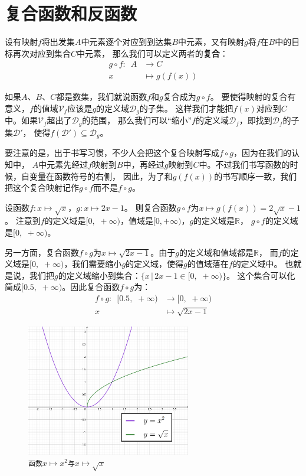\documentclass[12pt,UTF8]{ctexbook}
\begin{document}
\section{复合函数和反函数}

设有映射$f$将出发集$A$中元素逐个对应到到达集$B$中元素，又有映射$g$将$f$在$B$中的目标再次对应到集合$C$中元素，
那么我们可以定义两者的\textbf{复合}：
\begin{align*}
    g\circ f : \,\,\, A &\rightarrow C  \\
    x &\mapsto g(f(x)) 
\end{align*}

如果$A$、$B$、$C$都是数集，我们就说函数$f$和$g$复合成为$g\circ f$。
要使得映射的复合有意义，$f$的值域$\mathcal{V}_f$应该是$g$的定义域$\mathcal{D}_g$的子集。
这样我们才能把$f(x)$对应到$C$中。如果$\mathcal{V}_f$超出了$\mathcal{D}_g$的范围，
那么我们可以“缩小”$f$的定义域$\mathcal{D}_f$，即找到$\mathcal{D}_f$的子集$\mathcal{D}'$，
使得$f(\mathcal{D}')\subseteq \mathcal{D}_g$。

要注意的是，出于书写习惯，不少人会把这个复合映射写成$f\circ g$，因为在我们的认知中，
$A$中元素先经过$f$映射到$B$中，再经过$g$映射到$C$中。不过我们书写函数的时候，自变量在函数符号的右侧，
因此，为了和$g(f(x))$的书写顺序一致，我们把这个复合映射记作$g\circ f$而不是$f\circ g$。

设函数$f:x\mapsto \sqrt{x}$，$g:x\mapsto 2x - 1$。
则复合函数$g\circ f$为$x\mapsto g(f(x)) = 2\sqrt{x} - 1$。
注意到$f$的定义域是$[0, \,\,+\infty)$，值域是$[0, +\infty)$，$g$的定义域是$\mathbb{R}$，
$g\circ f$的定义域是$[0,\,\, +\infty)$。

另一方面，复合函数$f\circ g$为$x\mapsto \sqrt{2x - 1}$。由于$g$的定义域和值域都是$\mathbb{R}$，
而$f$的定义域是$[0,\,\, +\infty)$，我们需要缩小$g$的定义域，使得$g$的值域落在$f$的定义域中。
也就是说，我们把$g$的定义域缩小到集合：$\{x \,|\, 2x - 1 \in [0, \,\,+\infty)\}$。
这个集合可以化简成$[0.5, \,\,+\infty)$。因此复合函数$f\circ g$为：
\begin{align*}
    f\circ g : \,\,\, [0.5,\,\, +\infty) &\rightarrow [0,\,\, +\infty)  \\
    x &\mapsto \sqrt{2x - 1} 
\end{align*}

\begin{figure}[h] %
    \centering
    \includegraphics[width=0.64\textwidth]{tu/反函数1.png}
    \caption*{\texttt{函数}$x\mapsto x^2$\texttt{与}$x\mapsto \sqrt{x}$}
\end{figure}
\end{document}
